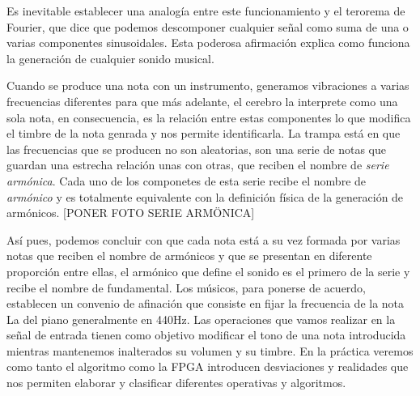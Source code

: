 Es inevitable establecer una analogía entre este funcionamiento y el terorema de Fourier, que dice que podemos descomponer cualquier señal como suma de una o varias componentes sinusoidales. Esta poderosa afirmación explica como funciona la generación de cualquier sonido musical.

Cuando se produce una nota con un instrumento, generamos vibraciones a varias frecuencias diferentes para que más adelante, el cerebro la interprete como una sola nota, en consecuencia, es la relación entre estas componentes lo que modifica el timbre de la nota genrada y nos permite identificarla. La trampa está en que las frecuencias que se producen no son aleatorias, son una serie de notas que guardan una estrecha relación unas con otras, que reciben el nombre de \emph{serie armónica}. Cada uno de los componetes de esta serie recibe el nombre de \emph{armónico} y es totalmente equivalente con la definición física de la generación de armónicos. [PONER FOTO SERIE ARMÖNICA]

Así pues, podemos concluir con que cada nota está a su vez formada por varias notas que reciben el nombre de armónicos y que se presentan en diferente proporción entre ellas, el armónico que define el sonido es el primero de la serie y recibe el nombre de fundamental. Los músicos, para ponerse de acuerdo, establecen un convenio de afinación que consiste en fijar la frecuencia de la nota La del piano generalmente en 440Hz.
Las operaciones que vamos realizar en la señal de entrada tienen como objetivo modificar el tono de una nota introducida mientras mantenemos inalterados su volumen y su timbre. En la práctica veremos como tanto el algoritmo como la FPGA introducen desviaciones y realidades que nos permiten elaborar y clasificar diferentes operativas y algoritmos.